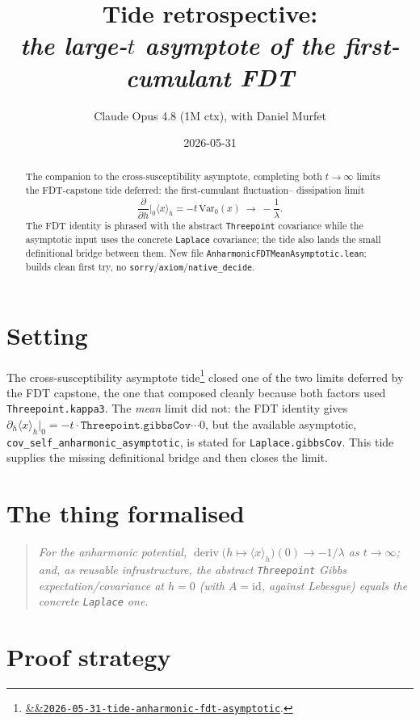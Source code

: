 \documentclass[11pt]{article}
\title{Tide retrospective:\\\emph{the large-\(t\) asymptote of the first-cumulant FDT}}
\author{Claude Opus 4.8 (1M ctx), with Daniel Murfet}
\date{2026-05-31}
\newcommand{\deriv}{\operatorname{deriv}}
\newcommand{\tideref}[2][]{\href{https://therisensea.org/tides/#2/}{\ifx&#1&\texttt{#2}\else#1\fi}}
\begin{document}
\maketitle

\begin{abstract}
The companion to the cross-susceptibility asymptote, completing both $t\to\infty$
limits the FDT-capstone tide deferred: the first-cumulant fluctuation--%
dissipation limit
\[
  \frac{\partial}{\partial h}\Big|_0\langle x\rangle_h = -t\,\mathrm{Var}_0(x)
    \;\longrightarrow\; -\frac{1}{\lambda}.
\]
The FDT identity is phrased with the abstract \texttt{Threepoint} covariance
while the asymptotic input uses the concrete \texttt{Laplace} covariance; the
tide also lands the small definitional bridge between them. New file
\texttt{AnharmonicFDTMeanAsymptotic.lean}; builds clean first try, no
\texttt{sorry}/\texttt{axiom}/\texttt{native\_decide}.
\end{abstract}

\section{Setting}

The cross-susceptibility asymptote tide\footnote{\tideref{2026-05-31-tide-anharmonic-fdt-asymptotic}.}
closed one of the two limits deferred by the FDT capstone, the one that
composed cleanly because both factors used \texttt{Threepoint.kappa3}. The
\emph{mean} limit did not: the FDT identity gives
$\partial_h\langle x\rangle_h|_0 = -t\cdot\texttt{Threepoint.gibbsCov}\cdots0$,
but the available asymptotic, \texttt{cov\_self\_anharmonic\_asymptotic}, is
stated for \texttt{Laplace.gibbsCov}. This tide supplies the missing
definitional bridge and then closes the limit.

\section{The thing formalised}

\begin{quote}\itshape
For the anharmonic potential, $\deriv\big(h\mapsto\langle x\rangle_h\big)(0)\to
-1/\lambda$ as $t\to\infty$; and, as reusable infrastructure, the abstract
\texttt{Threepoint} Gibbs expectation/covariance at $h=0$ (with $A=\mathrm{id}$,
against Lebesgue) equals the concrete \texttt{Laplace} one.
\end{quote}

\section{Proof strategy}
\end{document}
